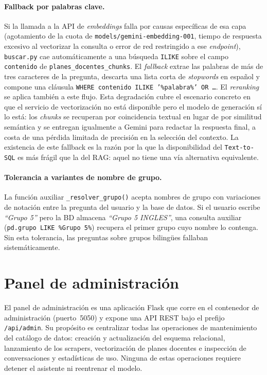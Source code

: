 \paragraph{Fallback por palabras clave.} Si la llamada a la API de \textit{embeddings} falla por causas específicas de esa capa (agotamiento de la cuota de \texttt{models/gemini-embedding-001}, tiempo de respuesta excesivo al vectorizar la consulta o error de red restringido a ese \textit{endpoint}), \texttt{buscar.py} cae automáticamente a una búsqueda \texttt{ILIKE} sobre el campo \texttt{contenido} de \texttt{planes\_docentes\_chunks}. El \textit{fallback} extrae las palabras de más de tres caracteres de la pregunta, descarta una lista corta de \textit{stopwords} en español y compone una cláusula \texttt{WHERE contenido ILIKE '\%palabra\%' OR \ldots}. El \textit{reranking} se aplica también a este flujo. Esta degradación cubre el escenario concreto en que el servicio de vectorización no está disponible pero el modelo de generación sí lo está: los \textit{chunks} se recuperan por coincidencia textual en lugar de por similitud semántica y se entregan igualmente a Gemini para redactar la respuesta final, a costa de una pérdida limitada de precisión en la selección del contexto. La existencia de este fallback es la razón por la que la disponibilidad del \texttt{Text-to-SQL} es más frágil que la del RAG: aquel no tiene una vía alternativa equivalente.

\paragraph{Tolerancia a variantes de nombre de grupo.} La función auxiliar \texttt{\_resolver\_grupo()} acepta nombres de grupo con variaciones de notación entre la pregunta del usuario y la base de datos. Si el usuario escribe \textit{``Grupo 5''} pero la BD almacena \textit{``Grupo 5 INGLES''}, una consulta auxiliar (\texttt{pd.grupo LIKE \%Grupo~5\%}) recupera el primer grupo cuyo nombre lo contenga. Sin esta tolerancia, las preguntas sobre grupos bilingües fallaban sistemáticamente.

\section{Panel de administración}\label{sec:impl-admin}

El panel de administración es una aplicación Flask que corre en el contenedor de administración (puerto~5050) y expone una API REST bajo el prefijo \texttt{/api/admin}. Su propósito es centralizar todas las operaciones de mantenimiento del catálogo de datos: creación y actualización del esquema relacional, lanzamiento de los scrapers, vectorización de planes docentes e inspección de conversaciones y estadísticas de uso. Ninguna de estas operaciones requiere detener el asistente ni reentrenar el modelo.

